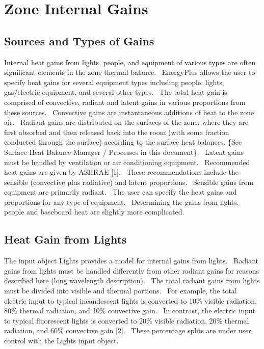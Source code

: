 \section{Zone Internal Gains }\label{zone-internal-gains}

\subsection{Sources and Types of Gains}\label{sources-and-types-of-gains}

Internal heat gains from lights, people, and equipment of various types are often significant elements in the zone thermal balance.~ EnergyPlus allows the user to specify heat gains for several equipment types including people, lights, gas/electric equipment, and several other types.~ The total heat gain is comprised of convective, radiant and latent gains in various proportions from these sources.~ Convective gains are instantaneous additions of heat to the zone air.~ Radiant gains are distributed on the surfaces of the zone, where they are first absorbed and then released back into the room (with some fraction conducted through the surface) according to the surface heat balances. \{See Surface Heat Balance Manager / Processes in this document\}.~ Latent gains must be handled by ventilation or air conditioning equipment.~ Recommended heat gains are given by ASHRAE {[}1{]}.~ These recommendations include the sensible (convective plus radiative) and latent proportions.~ Sensible gains from equipment are primarily radiant.~ The user can specify the heat gains and proportions for any type of equipment.~ Determining the gains from lights, people and baseboard heat are slightly more complicated.

\subsection{Heat Gain from Lights}\label{heat-gain-from-lights}

The input object Lights provides a model for internal gains from lights.~ Radiant gains from lights must be handled differently from other radiant gains for reasons described here (long wavelength description).~ The total radiant gains from lights must be divided into visible and thermal portions.~ For example, the total electric input to typical incandescent lights is converted to 10\% visible radiation, 80\% thermal radiation, and 10\% convective gain.~ In contrast, the electric input to typical fluorescent lights is converted to 20\% visible radiation, 20\% thermal radiation, and 60\% convective gain {[}2{]}.~ These percentage splits are under user control with the Lights input object.

